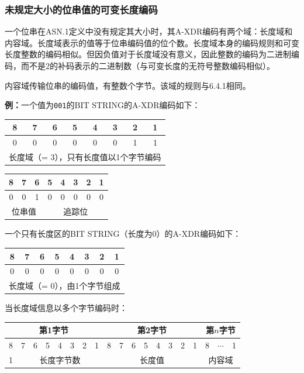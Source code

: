 \documentclass[a4paper,11pt]{ctexart}
\begin{document}
\subsubsection{未规定大小的位串值的可变长度编码}

一个位串在ASN.1定义中没有规定其大小时，其A-XDR编码有两个域：长度域和内容域。长度域表示的值等于位串编码值的位个数。长度域本身的编码规则和可变长度整数的编码相似。但因负值对于长度域没有意义，因此整数的编码为二进制编码，而不是2的补码表示的二进制数（与可变长度的无符号整数编码相似）。

内容域传输位串的编码值，有整数个字节。该域的规则与6.4.1相同。

\noindent\textbf{例：}一个值为\texttt{001}的BIT STRING的A-XDR编码如下：

\begin{center}
\begin{tabular}{|c|c|c|c|c|c|c|c|}
\hline
8 & 7 & 6 & 5 & 4 & 3 & 2 & 1 \\
\hline
0 & 0 & 0 & 0 & 0 & 0 & 1 & 1 \\
\hline
\multicolumn{8}{|c|}{长度域（= 3），只有长度值以1个字节编码} \\
\hline
\end{tabular}
\qquad
\begin{tabular}{|c|c|c|c|c|c|c|c|}
\hline
8 & 7 & 6 & 5 & 4 & 3 & 2 & 1 \\
\hline
0 & 0 & 1 & 0 & 0 & 0 & 0 & 0 \\
\hline
\multicolumn{3}{|c|}{位串值} & \multicolumn{5}{c|}{追踪位} \\
\hline
\end{tabular}
\end{center}

一个只有长度区的BIT STRING（长度为0）的A-XDR编码如下：

\begin{center}
\begin{tabular}{|c|c|c|c|c|c|c|c|}
\hline
8 & 7 & 6 & 5 & 4 & 3 & 2 & 1 \\
\hline
0 & 0 & 0 & 0 & 0 & 0 & 0 & 0 \\
\hline
\multicolumn{8}{|c|}{长度域（= 0），由1个字节组成} \\
\hline
\end{tabular}
\end{center}

\noindent 当长度域信息以多个字节编码时：

\begin{center}
\begin{tabular}{|c|c|c|c|c|c|c|c||c|c|c|c|c|c|c|c||c|c|c|}
\hline
\multicolumn{8}{|c|}{第1字节} & \multicolumn{8}{|c|}{第2字节} & \multicolumn{4}{|c|}{第$n$字节} \\
\hline
8 & 7 & 6 & 5 & 4 & 3 & 2 & 1 & 8 & 7 & 6 & 5 & 4 & 3 & 2 & 1 & 8 & $\cdots$ & 1 \\
\hline
\multicolumn{1}{|c|}{1} & \multicolumn{7}{c|}{长度字节数} & \multicolumn{8}{|c|}{长度值} & \multicolumn{4}{|c|}{内容域} \\
\hline
\end{tabular}
\end{center}
\end{document}
